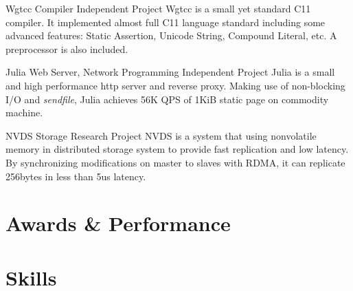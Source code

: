 \documentclass[11pt,a4paper]{moderncv}
\begin{document}
{Wgtcc}
{Compiler}
{Independent Project}{}{
	Wgtcc is a small yet standard C11 compiler. It implemented almost full C11 language standard including some advanced features: Static Assertion, Unicode String, Compound Literal, etc. A preprocessor is also included. 
}

{Julia}
{Web Server, Network Programming}
{Independent Project}{}{
	Julia is a small and high performance http server and reverse proxy. Making use of non-blocking I/O and \textit{sendfile}, Julia achieves 56K QPS of 1KiB static page on commodity machine.
}

{NVDS}
{Storage}
{Research Project}{}{
	NVDS is a system that using nonvolatile memory in distributed storage system to provide fast replication and low latency. By synchronizing modifications on master to slaves with RDMA, it can replicate 256bytes in less than 5us latency.
}






\section{Awards \& Performance}

\section{Skills}

\clearpage
\end{document}
